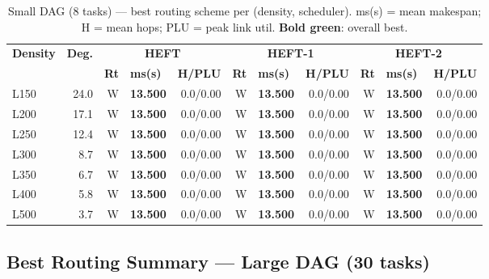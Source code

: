 \documentclass[11pt]{article}
\newcommand{\win}[1]{\textcolor{green!50!black}{\textbf{#1}}}
\begin{document}
\begin{table}[H]
\centering\small
\begin{tabular}{l r r@{\,}l@{\,}r r@{\,}l@{\,}r r@{\,}l@{\,}r}
\toprule
\textbf{Density} & \textbf{Deg.} & \multicolumn{3}{c}{\textbf{HEFT}} & \multicolumn{3}{c}{\textbf{HEFT-1}} & \multicolumn{3}{c}{\textbf{HEFT-2}} \\
\cmidrule(lr){3-5}\cmidrule(lr){6-8}\cmidrule(lr){9-11}
& & \textbf{Rt} & \textbf{ms(s)} & \textbf{H/PLU} & \textbf{Rt} & \textbf{ms(s)} & \textbf{H/PLU} & \textbf{Rt} & \textbf{ms(s)} & \textbf{H/PLU} \\
\midrule
  L150 & 24.0 & W & \win{13.500} & 0.0/0.00 & W & \win{13.500} & 0.0/0.00 & W & \win{13.500} & 0.0/0.00 \\
  L200 & 17.1 & W & \win{13.500} & 0.0/0.00 & W & \win{13.500} & 0.0/0.00 & W & \win{13.500} & 0.0/0.00 \\
  L250 & 12.4 & W & \win{13.500} & 0.0/0.00 & W & \win{13.500} & 0.0/0.00 & W & \win{13.500} & 0.0/0.00 \\
  L300 & 8.7 & W & \win{13.500} & 0.0/0.00 & W & \win{13.500} & 0.0/0.00 & W & \win{13.500} & 0.0/0.00 \\
  L350 & 6.7 & W & \win{13.500} & 0.0/0.00 & W & \win{13.500} & 0.0/0.00 & W & \win{13.500} & 0.0/0.00 \\
  L400 & 5.8 & W & \win{13.500} & 0.0/0.00 & W & \win{13.500} & 0.0/0.00 & W & \win{13.500} & 0.0/0.00 \\
  L500 & 3.7 & W & \win{13.500} & 0.0/0.00 & W & \win{13.500} & 0.0/0.00 & W & \win{13.500} & 0.0/0.00 \\
\bottomrule
\end{tabular}
\caption{Small DAG (8 tasks) --- best routing scheme per (density, scheduler). ms(s) = mean makespan; H = mean hops; PLU = peak link util. \win{Bold green}: overall best.}
\end{table}

\subsection{Best Routing Summary --- Large DAG (30 tasks)}
\end{document}
